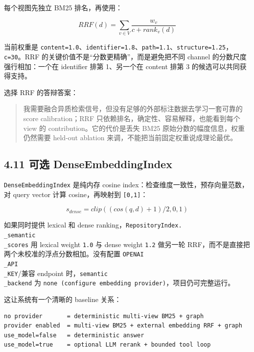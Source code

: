 \documentclass[UTF8,12pt,openany]{ctexbook}
\begin{document}
每个视图先独立 BM25 排名，再使用：\par

\[
RRF(d)=\sum_{v\in V}\frac{w_v}{c+rank_v(d)}
\]

当前权重是 \texttt{content=1.0}、\texttt{identifier=1.8}、\texttt{path=1.1}、\texttt{structure=1.25}，\texttt{c=30}。RRF 的关键价值不是“分数更精确”，而是避免把不同 channel 的分数尺度强行相加：一个在 identifier 排第 1、另一个在 content 排第 3 的候选可以共同获得支持。\par

选择 RRF 的答辩答案：\par

\begin{quote}
我需要融合异质检索信号，但没有足够的外部标注数据去学习一套可靠的 score calibration；RRF 只依赖排名，确定性、容易解释，也能看到每个 view 的 contribution。它的代价是丢失 BM25 原始分数的幅度信息，权重仍然需要 held-out ablation 来调，不能把当前固定权重说成理论最优。
\end{quote}

\subsection{4.11 可选 DenseEmbeddingIndex}

\texttt{DenseEmbeddingIndex} 是纯内存 cosine index：检查维度一致性，预存向量范数，对 query vector 计算 cosine，再映射到 \texttt{[0,1]}：\par

\[
s_{dense}=clip((cos(q,d)+1)/2,0,1)
\]

如果同时提供 lexical 和 dense ranking，\texttt{RepositoryIndex.\\_semantic\\_scores} 用 lexical weight \texttt{1.0} 与 dense weight \texttt{1.2} 做另一轮 RRF，而不是直接把两个未校准的浮点分数相加。没有配置 \texttt{OPENAI\\_API\\_KEY}/兼容 endpoint 时，\texttt{semantic\\_backend} 为 \texttt{none (configure embedding provider)}，项目仍可完整运行。\par

这让系统有一个清晰的 baseline 关系：\par

\begin{lstlisting}
no provider       = deterministic multi-view BM25 + graph
provider enabled  = multi-view BM25 + external embedding RRF + graph
use_model=false   = deterministic answer
use_model=true    = optional LLM rerank + bounded tool loop
\end{lstlisting}
\end{document}
